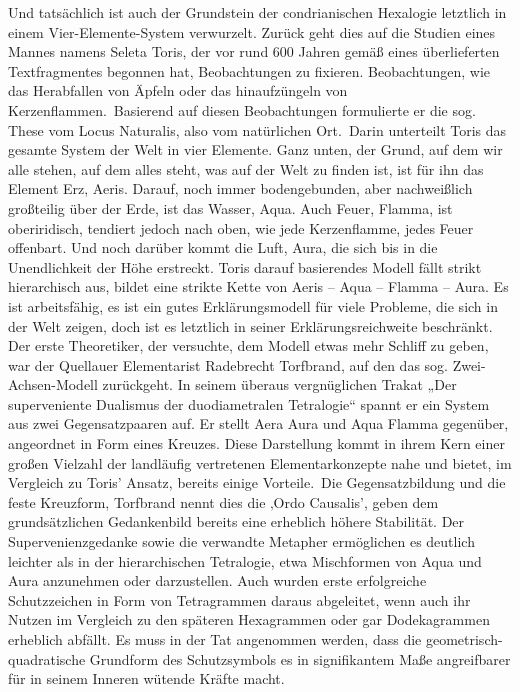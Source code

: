 \documentclass[a5paper,8pt]{book}
\begin{document}
Und tatsächlich ist auch der Grundstein der condrianischen Hexalogie letztlich in einem Vier-Elemente-System verwurzelt. Zurück geht dies auf die Studien eines Mannes namens 
Seleta Toris, der vor rund 600 Jahren gemäß eines überlieferten Textfragmentes begonnen hat, Beobachtungen zu fixieren. Beobachtungen, wie das Herabfallen von Äpfeln oder das 
hinaufzüngeln von Kerzenflammen.\
Basierend auf diesen Beobachtungen formulierte er die sog. These vom Locus Naturalis, also vom natürlichen Ort.\
Darin unterteilt Toris das gesamte System der Welt in vier Elemente. Ganz unten, der Grund, auf dem wir alle stehen, auf dem alles steht, was auf der Welt zu finden ist, ist 
für ihn das Element Erz, Aeris. Darauf, noch immer bodengebunden, aber nachweißlich großteilig über der Erde, ist das Wasser, Aqua. Auch Feuer, Flamma, ist oberiridisch, 
tendiert jedoch nach oben, wie jede Kerzenflamme, jedes Feuer offenbart. Und noch darüber kommt die Luft, Aura, die sich bis in die Unendlichkeit der Höhe erstreckt.
Toris darauf basierendes Modell fällt strikt hierarchisch aus, bildet eine strikte Kette von Aeris – Aqua – Flamma – Aura. Es ist arbeitsfähig, es ist ein gutes Erklärungsmodell 
für viele Probleme, die sich in der Welt zeigen, doch ist es letztlich in seiner Erklärungsreichweite beschränkt.\\

Der erste Theoretiker, der versuchte, dem Modell etwas mehr Schliff zu geben, war der Quellauer Elementarist Radebrecht Torfbrand, auf den das sog. Zwei-Achsen-Modell 
zurückgeht. In seinem überaus vergnüglichen Trakat „Der superveniente Dualismus der duodiametralen Tetralogie“ spannt er ein System aus zwei Gegensatzpaaren auf. Er stellt 
Aera Aura und Aqua Flamma gegenüber, angeordnet in Form eines Kreuzes. Diese Darstellung kommt in ihrem Kern einer großen Vielzahl der landläufig vertretenen Elementarkonzepte 
nahe und bietet, im Vergleich zu Toris’ Ansatz, bereits einige Vorteile.\
Die Gegensatzbildung und die feste Kreuzform, Torfbrand nennt dies die ‚Ordo Causalis’, geben dem grundsätzlichen Gedankenbild bereits eine erheblich höhere Stabilität. Der 
Supervenienzgedanke sowie die verwandte Metapher ermöglichen es deutlich leichter als in der hierarchischen Tetralogie, etwa Mischformen von Aqua und Aura anzunehmen oder 
darzustellen. Auch wurden erste erfolgreiche Schutzzeichen in Form von Tetragrammen daraus abgeleitet, wenn auch ihr Nutzen im Vergleich zu den späteren Hexagrammen oder gar 
Dodekagrammen erheblich abfällt. Es muss in der Tat angenommen werden, dass die geometrisch-quadratische Grundform des Schutzsymbols es in signifikantem Maße angreifbarer für 
in seinem Inneren wütende Kräfte macht.\\
\end{document}
